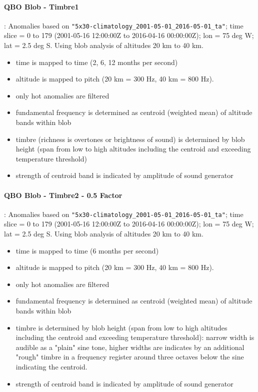 \documentclass[11pt,a4paper]{article}
\begin{document}
\paragraph{QBO Blob - Timbre1}:
Anomalies based on \Verb!"5x30-climatology_2001-05-01_2016-05-01_ta"!; time slice = 0 to 179 (2001-05-16 12:00:00Z to 2016-04-16 00:00:00Z); lon = 75 deg W; lat = 2.5 deg S. Using blob analysis of altitudes 20 km to 40 km.
%
\begin{itemize}
\item time is mapped to time (2, 6, 12 months per second)
\item altitude is mapped to pitch (20 km = 300 Hz, 40 km = 800 Hz).
\item only hot anomalies are filtered
\item fundamental frequency is determined as centroid (weighted mean) of altitude bands within blob
\item timbre (richness is overtones or brightness of sound) is determined by blob height (span from low to high altitudes including the centroid and exceeding temperature threshold)
\item strength of centroid band is indicated by amplitude of sound generator
\end{itemize}

\paragraph{QBO Blob - Timbre2 - 0.5 Factor}:
Anomalies based on \Verb!"5x30-climatology_2001-05-01_2016-05-01_ta"!; time slice = 0 to 179 (2001-05-16 12:00:00Z to 2016-04-16 00:00:00Z); lon = 75 deg W; lat = 2.5 deg S. Using blob analysis of altitudes 20 km to 40 km.
%
\begin{itemize}
\item time is mapped to time (6 months per second)
\item altitude is mapped to pitch (20 km = 300 Hz, 40 km = 800 Hz).
\item only hot anomalies are filtered
\item fundamental frequency is determined as centroid (weighted mean) of altitude bands within blob
\item timbre is determined by blob height (span from low to high altitudes including the centroid and exceeding temperature threshold): narrow width is audible as a "plain" sine tone, higher widths are indicates by an additional "rough" timbre in a frequency register around three octaves below the sine indicating the centroid.
\item strength of centroid band is indicated by amplitude of sound generator
\end{itemize}
\end{document}
